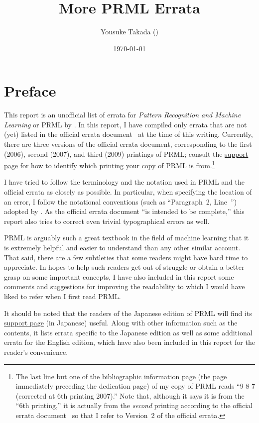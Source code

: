 \documentclass[12pt,a4paper]{article}
\title{More PRML Errata}
\author{Yousuke Takada (\github{yousuketakada}) \\ \email{yousuketakada@gmail.com}}
\date{\today}
\newcommand{\Section}[1]{%
\section*{#1}
\addcontentsline{toc}{section}{#1}}
\begin{document}
\maketitle

\Section{Preface}
This report is an unofficial list of errata for \emph{Pattern Recognition and Machine Learning} or
PRML by \citet*{Bishop:PRML}.
In this report, I have compiled only errata
that are not (yet) listed in the official errata document~\citep{Svensen:PRML_errata}
at the time of this writing.
Currently, there are three versions of the official errata document,
corresponding to the first (2006), second (2007), and third (2009) printings of PRML;
consult the
\href{https://www.microsoft.com/en-us/research/people/cmbishop/\#prml-book}{support page}
for how to identify which printing your copy of PRML is from.\footnote{%
The last line but one of the bibliographic information page
(the page immediately preceding the dedication page) of my copy of PRML
reads ``9 8 7 (corrected at 6th printing 2007).''
Note that, although it says it is from the ``6th printing,''
it is actually from the \emph{second} printing according to
the official errata document~\citep{Svensen:PRML_errata}
so that I refer to Version~2 of the official errata.}

I have tried to follow the terminology and the notation used in PRML and the official errata
as closely as possible.
In particular, when specifying the location of an error,
I follow the notational conventions (such as ``Paragraph~2, Line~'')
adopted by \citet{Svensen:PRML_errata}.
As the official errata document ``is intended to be complete,''
this report also tries to correct even trivial typographical errors as well.

PRML is arguably such a great textbook in the field of machine learning
that it is extremely helpful and easier to understand than any other similar account.
That said, there are a few subtleties
that some readers might have hard time to appreciate.
In hopes to help such readers get out of struggle or
obtain a better grasp on some important concepts,
I have also included in this report some comments and suggestions for improving the readability
to which I would have liked to refer when I first read PRML.

It should be noted that the readers of the Japanese edition of PRML will find its
\href{http://ibisforest.org/index.php?PRML}{support page} (in Japanese) useful.
Along with other information such as the contents,
it lists errata specific to the Japanese edition as well as
some additional errata for the English edition,
which have also been included in this report for the reader's convenience.
\end{document}
